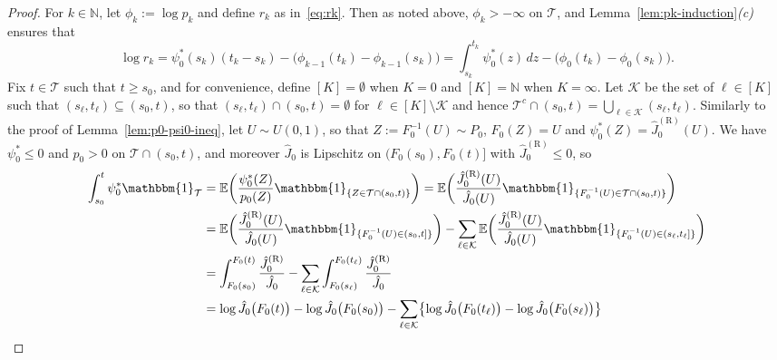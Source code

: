 \documentclass[10pt,a4paper]{amsart}
\newcommand{\E}{\mathbb{E}}
\newcommand{\Ind}{\mathbbm{1}}
\newcommand{\N}{\mathbb{N}}
\begin{document}
\begin{proof}
For $k \in \N$, let $\phi_k := \log p_k$ and define $r_k$ as in~\eqref{eq:rk}. Then as noted above, $\phi_k > -\infty$ on $\mathcal{T}$, and Lemma~\ref{lem:pk-induction}\textit{(c)} ensures that
\begin{equation}
\label{eq:log-rk}
\log r_k = \psi_0^*(s_k)(t_k - s_k) - \bigl(\phi_{k-1}(t_k) - \phi_{k-1}(s_k)\bigr) = \int_{s_k}^{t_k}\psi_0^*(z)\,dz - \bigl(\phi_0(t_k) - \phi_0(s_k)\bigr).
\end{equation}
Fix $t \in \mathcal{T}$ such that $t \geq s_0$, and for convenience, define $[K] = \emptyset$ when $K = 0$ and $[K] = \N$ when $K = \infty$. Let $\mathcal{K}$ be the set of $\ell \in [K]$ such that $(s_\ell,t_\ell) \subseteq (s_0,t)$, so that $(s_\ell,t_\ell) \cap (s_0,t) = \emptyset$ for $\ell \in [K] \setminus \mathcal{K}$ and hence $\mathcal{T}^c \cap (s_0,t) = \bigcup_{\ell \in \mathcal{K}}(s_\ell,t_\ell)$. Similarly to the proof of Lemma~\ref{lem:p0-psi0-ineq}, let $U \sim U(0,1)$, so that $Z := F_0^{-1}(U)\sim P_0$, $F_0(Z) = U$ and $\psi_0^*(Z) = \hat{J}_0^{(\mathrm{R})}(U)$. We have $\psi_0^* \leq 0$ and $p_0 > 0$ on $\mathcal{T} \cap (s_0,t)$, and moreover $\hat{J}_0$ is Lipschitz on $(F_0(s_0),F_0(t)]$ with $\hat{J}_0^{(\mathrm{R})} \leq 0$, so
\begin{align}
\int_{s_0}^t \psi_0^* \Ind_{\mathcal{T}} &= \E\biggl(\frac{\psi_0^*(Z)}{p_0(Z)}\Ind_{\{Z \in \mathcal{T} \cap (s_0,t)\}}\biggr) = \E\biggl(\frac{\hat{J}_0^{(\mathrm{R})}(U)}{\hat{J}_0(U)}\Ind_{\{F_0^{-1}(U) \in \mathcal{T} \cap (s_0,t)\}}\biggr) \notag \\
&= \E\biggl(\frac{\hat{J}_0^{(\mathrm{R})}(U)}{\hat{J}_0(U)}\Ind_{\{F_0^{-1}(U) \in (s_0,t]\}}\biggr) - \sum_{\ell \in \mathcal{K}} \E\biggl(\frac{\hat{J}_0^{(\mathrm{R})}(U)}{\hat{J}_0(U)}\Ind_{\{F_0^{-1}(U) \in (s_\ell,t_\ell]\}}\biggr) \notag \\
&= \int_{F_0(s_0)}^{F_0(t)} \frac{\hat{J}_0^{(\mathrm{R})}}{\hat{J}_0} - \sum_{\ell \in \mathcal{K}} \int_{F_0(s_\ell)}^{F_0(t_\ell)} \frac{\hat{J}_0^{(\mathrm{R})}}{\hat{J}_0} \notag \\
&= \log\hat{J}_0\bigl(F_0(t)\bigr) - \log\hat{J}_0\bigl(F_0(s_0)\bigr) - \sum_{\ell \in \mathcal{K}} \bigl\{\log\hat{J}_0\bigl(F_0(t_\ell)\bigr) - \log\hat{J}_0\bigl(F_0(s_\ell)\bigr)\bigr\} \notag \\

\end{align}
\end{proof}
\end{document}
